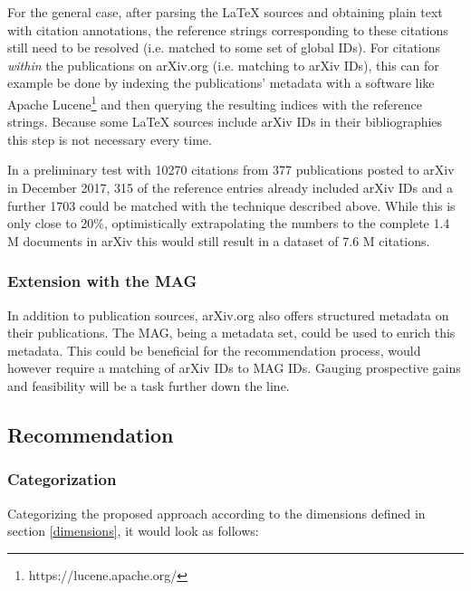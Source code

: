 \documentclass{proseminar}
\begin{document}
For the general case, after parsing the LaTeX sources and obtaining plain text with citation annotations, the reference strings corresponding to these citations still need to be resolved (i.e. matched to some set of global IDs). For citations \emph{within} the publications on arXiv.org (i.e. matching to arXiv IDs), this can for example be done by indexing the publications' metadata with a software like Apache Lucene\footnote{https://lucene.apache.org/} and then querying the resulting indices with the reference strings. Because some LaTeX sources include arXiv IDs in their bibliographies this step is not necessary every time.

In a preliminary test with 10270 citations from 377 publications posted to arXiv in December 2017, 315 of the reference entries already included arXiv IDs and a further 1703 could be matched with the technique described above. While this is only close to 20\%, optimistically extrapolating the numbers to the complete 1.4 M documents in arXiv this would still result in a dataset of 7.6 M citations.

\subsubsection{Extension with the MAG}
In addition to publication sources, arXiv.org also offers structured metadata on their publications. The MAG, being a metadata set, could be used to enrich this metadata. This could be beneficial for the recommendation process, would however require a matching of arXiv IDs to MAG IDs. Gauging prospective gains and feasibility will be a task further down the line.

\subsection{Recommendation}
\subsubsection{Categorization}
Categorizing the proposed approach according to the dimensions defined in section \ref{dimensions}, it would look as follows:
\end{document}

